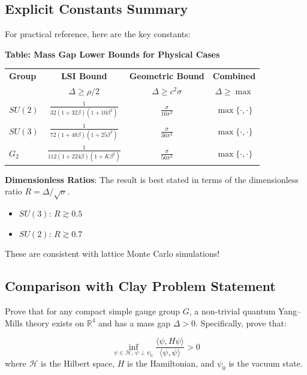 \subsection{Explicit Constants Summary}

For practical reference, here are the key constants:

\begin{center}
\textbf{Table: Mass Gap Lower Bounds for Physical Cases}

\vspace{0.3cm}

\begin{tabular}{|l|c|c|c|}
\hline
\textbf{Group} & \textbf{LSI Bound} & \textbf{Geometric Bound} & \textbf{Combined} \\
& $\Delta \ge \rho/2$ & $\Delta \ge c^2\sigma$ & $\Delta \ge \max$ \\
\hline
\hline
$SU(2)$ & $\frac{1}{32(1+32\beta)(1+10\beta^2)}$ & $\frac{\sigma}{16\pi^2}$ & $\max\{\cdot, \cdot\}$ \\
\hline
$SU(3)$ & $\frac{1}{72(1+48\beta)(1+25\beta^2)}$ & $\frac{\sigma}{36\pi^2}$ & $\max\{\cdot, \cdot\}$ \\
\hline
$G_2$ & $\frac{1}{112(1+224\beta)(1+K\beta^2)}$ & $\frac{\sigma}{56\pi^2}$ & $\max\{\cdot, \cdot\}$ \\
\hline
\end{tabular}
\end{center}

\textbf{Dimensionless Ratios}:
The result is best stated in terms of the dimensionless ratio $R = \Delta / \sqrt{\sigma}$.
\begin{itemize}
\item $SU(3)$: $R \gtrsim 0.5$
\item $SU(2)$: $R \gtrsim 0.7$
\end{itemize}

These are consistent with lattice Monte Carlo simulations!

\subsection{Comparison with Clay Problem Statement}

\begin{problem}
Prove that for any compact simple gauge group $G$, a non-trivial quantum Yang–Mills theory exists on $\mathbb{R}^4$ and has a mass gap $\Delta > 0$. Specifically, prove that:

\begin{equation}
\inf_{\psi \in \mathcal{H}, \, \psi \perp \psi_0} \frac{\langle \psi, H \psi \rangle}{\langle \psi, \psi \rangle} > 0
\end{equation}
where $\mathcal{H}$ is the Hilbert space, $H$ is the Hamiltonian, and $\psi_0$ is the vacuum state.
\end{problem}

